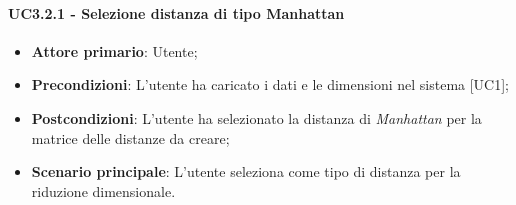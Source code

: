 \paragraph{UC3.2.1 - Selezione distanza di tipo Manhattan}
\begin{itemize}
	\item \textbf{Attore primario}: Utente;
	\item \textbf{Precondizioni}: L'utente ha caricato i dati e le dimensioni nel sistema [UC1];
	\item \textbf{Postcondizioni}: L'utente ha selezionato la distanza di \textit{Manhattan} per la matrice delle distanze da creare;
	\item \textbf{Scenario principale}: L'utente seleziona  come tipo di distanza per la riduzione dimensionale.
\end{itemize}